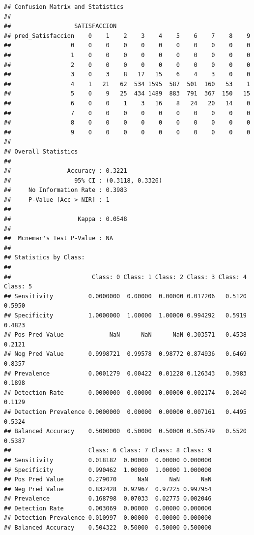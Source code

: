 \documentclass[
]{article}
\begin{document}
\begin{verbatim}
## Confusion Matrix and Statistics
## 
##                  SATISFACCION
## pred_Satisfaccion    0    1    2    3    4    5    6    7    8    9
##                 0    0    0    0    0    0    0    0    0    0    0
##                 1    0    0    0    0    0    0    0    0    0    0
##                 2    0    0    0    0    0    0    0    0    0    0
##                 3    0    3    8   17   15    6    4    3    0    0
##                 4    1   21   62  534 1595  587  501  160   53    1
##                 5    0    9   25  434 1489  883  791  367  150   15
##                 6    0    0    1    3   16    8   24   20   14    0
##                 7    0    0    0    0    0    0    0    0    0    0
##                 8    0    0    0    0    0    0    0    0    0    0
##                 9    0    0    0    0    0    0    0    0    0    0
## 
## Overall Statistics
##                                           
##                Accuracy : 0.3221          
##                  95% CI : (0.3118, 0.3326)
##     No Information Rate : 0.3983          
##     P-Value [Acc > NIR] : 1               
##                                           
##                   Kappa : 0.0548          
##                                           
##  Mcnemar's Test P-Value : NA              
## 
## Statistics by Class:
## 
##                       Class: 0 Class: 1 Class: 2 Class: 3 Class: 4 Class: 5
## Sensitivity          0.0000000  0.00000  0.00000 0.017206   0.5120   0.5950
## Specificity          1.0000000  1.00000  1.00000 0.994292   0.5919   0.4823
## Pos Pred Value             NaN      NaN      NaN 0.303571   0.4538   0.2121
## Neg Pred Value       0.9998721  0.99578  0.98772 0.874936   0.6469   0.8357
## Prevalence           0.0001279  0.00422  0.01228 0.126343   0.3983   0.1898
## Detection Rate       0.0000000  0.00000  0.00000 0.002174   0.2040   0.1129
## Detection Prevalence 0.0000000  0.00000  0.00000 0.007161   0.4495   0.5324
## Balanced Accuracy    0.5000000  0.50000  0.50000 0.505749   0.5520   0.5387
##                      Class: 6 Class: 7 Class: 8 Class: 9
## Sensitivity          0.018182  0.00000  0.00000 0.000000
## Specificity          0.990462  1.00000  1.00000 1.000000
## Pos Pred Value       0.279070      NaN      NaN      NaN
## Neg Pred Value       0.832428  0.92967  0.97225 0.997954
## Prevalence           0.168798  0.07033  0.02775 0.002046
## Detection Rate       0.003069  0.00000  0.00000 0.000000
## Detection Prevalence 0.010997  0.00000  0.00000 0.000000
## Balanced Accuracy    0.504322  0.50000  0.50000 0.500000
\end{verbatim}
\end{document}
